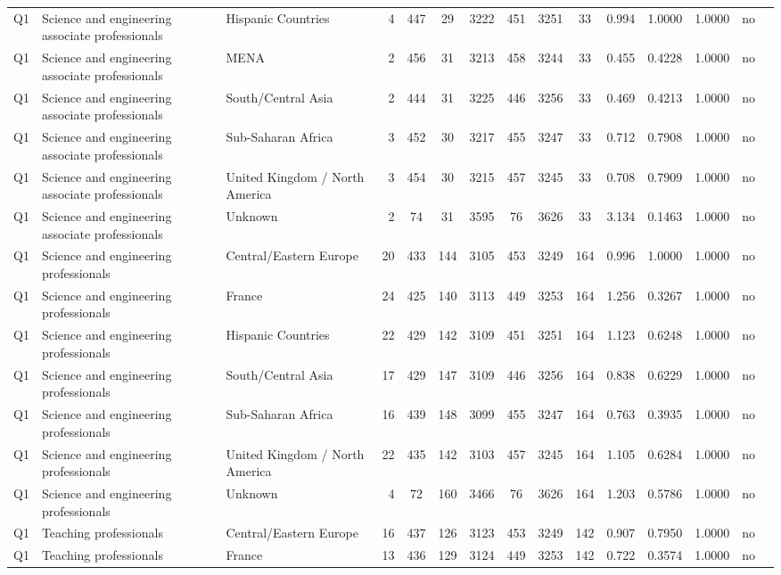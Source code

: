 \begin{longtable}{lllrcccccccccll}
Q1 & Science and engineering associate professionals & Hispanic Countries & 4 & 447 & 29 & 3222 & 451 & 3251 & 33 & 0.994 & 1.0000 & 1.0000 & no \\
Q1 & Science and engineering associate professionals & MENA & 2 & 456 & 31 & 3213 & 458 & 3244 & 33 & 0.455 & 0.4228 & 1.0000 & no \\
Q1 & Science and engineering associate professionals & South/Central Asia & 2 & 444 & 31 & 3225 & 446 & 3256 & 33 & 0.469 & 0.4213 & 1.0000 & no \\
Q1 & Science and engineering associate professionals & Sub-Saharan Africa & 3 & 452 & 30 & 3217 & 455 & 3247 & 33 & 0.712 & 0.7908 & 1.0000 & no \\
Q1 & Science and engineering associate professionals & United Kingdom / North America & 3 & 454 & 30 & 3215 & 457 & 3245 & 33 & 0.708 & 0.7909 & 1.0000 & no \\
Q1 & Science and engineering associate professionals & Unknown & 2 & 74 & 31 & 3595 & 76 & 3626 & 33 & 3.134 & 0.1463 & 1.0000 & no \\
Q1 & Science and engineering professionals & Central/Eastern Europe & 20 & 433 & 144 & 3105 & 453 & 3249 & 164 & 0.996 & 1.0000 & 1.0000 & no \\
Q1 & Science and engineering professionals & France & 24 & 425 & 140 & 3113 & 449 & 3253 & 164 & 1.256 & 0.3267 & 1.0000 & no \\
Q1 & Science and engineering professionals & Hispanic Countries & 22 & 429 & 142 & 3109 & 451 & 3251 & 164 & 1.123 & 0.6248 & 1.0000 & no \\
Q1 & Science and engineering professionals & South/Central Asia & 17 & 429 & 147 & 3109 & 446 & 3256 & 164 & 0.838 & 0.6229 & 1.0000 & no \\
Q1 & Science and engineering professionals & Sub-Saharan Africa & 16 & 439 & 148 & 3099 & 455 & 3247 & 164 & 0.763 & 0.3935 & 1.0000 & no \\
Q1 & Science and engineering professionals & United Kingdom / North America & 22 & 435 & 142 & 3103 & 457 & 3245 & 164 & 1.105 & 0.6284 & 1.0000 & no \\
Q1 & Science and engineering professionals & Unknown & 4 & 72 & 160 & 3466 & 76 & 3626 & 164 & 1.203 & 0.5786 & 1.0000 & no \\
Q1 & Teaching professionals & Central/Eastern Europe & 16 & 437 & 126 & 3123 & 453 & 3249 & 142 & 0.907 & 0.7950 & 1.0000 & no \\
Q1 & Teaching professionals & France & 13 & 436 & 129 & 3124 & 449 & 3253 & 142 & 0.722 & 0.3574 & 1.0000 & no \\

\end{longtable}
